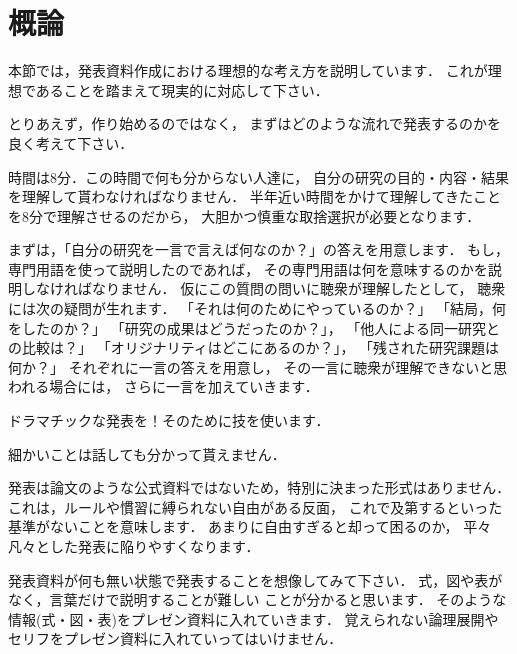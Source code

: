 \documentclass[a4j,12pt,dvipdfmx,oneside]{jsbook}
\theoremstyle{definition}
\begin{document}
\section{概論}\label{sec:presen_intro}
%
%
%
本節では，発表資料作成における理想的な考え方を説明しています．
これが理想であることを踏まえて現実的に対応して下さい．

とりあえず，作り始めるのではなく，
まずはどのような流れで発表するのかを良く考えて下さい．

時間は8分．この時間で何も分からない人達に，
自分の研究の目的・内容・結果を理解して貰わなければなりません．
半年近い時間をかけて理解してきたことを8分で理解させるのだから，
大胆かつ慎重な取捨選択が必要となります．

まずは，「自分の研究を一言で言えば何なのか？」の答えを用意します．
もし，専門用語を使って説明したのであれば，
その専門用語は何を意味するのかを説明しなければなりません．
仮にこの質問の問いに聴衆が理解したとして，
聴衆には次の疑問が生れます．
「それは何のためにやっているのか？」
「結局，何をしたのか？」
「研究の成果はどうだったのか？」，
「他人による同一研究との比較は？」
「オリジナリティはどこにあるのか？」，
「残された研究課題は何か？」
それぞれに一言の答えを用意し，
その一言に聴衆が理解できないと思われる場合には，
さらに一言を加えていきます．

ドラマチックな発表を！そのために技を使います．
	
細かいことは話しても分かって貰えません．

発表は論文のような公式資料ではないため，特別に決まった形式はありません．
これは，ルールや慣習に縛られない自由がある反面，
これで及第するといった基準がないことを意味します．
あまりに自由すぎると却って困るのか，
平々凡々とした発表に陥りやすくなります．

発表資料が何も無い状態で発表することを想像してみて下さい．
式，図や表がなく，言葉だけで説明することが難しい
ことが分かると思います．
そのような情報(式・図・表)をプレゼン資料に入れていきます．
覚えられない論理展開やセリフをプレゼン資料に入れていってはいけません．
%
%
%
\end{document}
